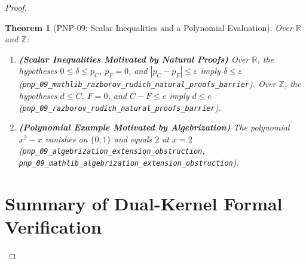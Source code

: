 \documentclass[11pt,a4paper]{article}
\theoremstyle{plain}
\newtheorem{theorem}{Theorem}[section]
\theoremstyle{definition}
\theoremstyle{remark}
\newcommand{\R}{\mathbb{R}}
\newcommand{\Z}{\mathbb{Z}}
\begin{document}
\begin{proof}
\begin{theorem}[$\mathrm{PNP\text{-}09}$: Scalar Inequalities and a Polynomial Evaluation]\label{thm:pnp09}
Over $\R$ and $\Z$:
\begin{enumerate}
  \item \textbf{(Scalar Inequalities Motivated by Natural Proofs)} Over $\R$, the hypotheses $0 \le \delta \le p_C$, $p_F = 0$, and $|p_C-p_F| \le \varepsilon$ imply $\delta \le \varepsilon$ (\texttt{pnp\_09\_mathlib\_razborov\_rudich\_natural\_proofs\_barrier}). Over $\Z$, the hypotheses $d \le C$, $F=0$, and $C-F \le e$ imply $d \le e$ (\texttt{pnp\_09\_razborov\_rudich\_natural\_proofs\_barrier}).
  \item \textbf{(Polynomial Example Motivated by Algebrization)} The polynomial $x^2 - x$ vanishes on $\{0, 1\}$ and equals $2$ at $x = 2$ (\texttt{pnp\_09\_algebrization\_extension\_obstruction}, \texttt{pnp\_09\_mathlib\_algebrization\_extension\_obstruction}).
\end{enumerate}
\end{theorem}

\section{Summary of Dual-Kernel Formal Verification}


\end{proof}
\end{document}
